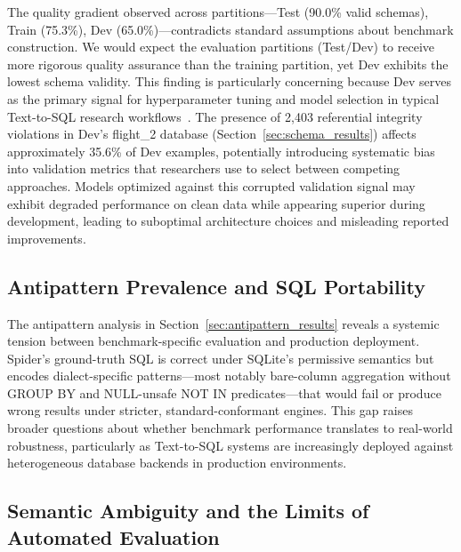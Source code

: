 \documentclass[print]{einformatica}
\begin{document}
The quality gradient observed across partitions---Test (90.0\% valid schemas), Train (75.3\%), Dev (65.0\%)---contradicts standard assumptions about benchmark construction. We would expect the evaluation partitions (Test/Dev) to receive more rigorous quality assurance than the training partition, yet Dev exhibits the lowest schema validity. This finding is particularly concerning because Dev serves as the primary signal for hyperparameter tuning and model selection in typical Text-to-SQL research workflows~\cite{gao2023text2sql,yu2018spider}. The presence of 2,403 referential integrity violations in Dev's flight\_2 database (Section~\ref{sec:schema_results}) affects approximately 35.6\% of Dev examples, potentially introducing systematic bias into validation metrics that researchers use to select between competing approaches. Models optimized against this corrupted validation signal may exhibit degraded performance on clean data while appearing superior during development, leading to suboptimal architecture choices and misleading reported improvements.

\subsection{Antipattern Prevalence and SQL Portability}

The antipattern analysis in Section~\ref{sec:antipattern_results} reveals a systemic tension between benchmark-specific evaluation and production deployment. Spider's ground-truth SQL is correct under SQLite's permissive semantics but encodes dialect-specific patterns---most notably bare-column aggregation without GROUP BY and NULL-unsafe NOT IN predicates---that would fail or produce wrong results under stricter, standard-conformant engines. This gap raises broader questions about whether benchmark performance translates to real-world robustness, particularly as Text-to-SQL systems are increasingly deployed against heterogeneous database backends in production environments.

\subsection{Semantic Ambiguity and the Limits of Automated Evaluation}
\end{document}
